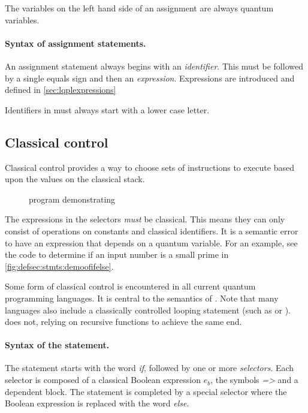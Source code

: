 The variables  on the left hand side of an
assignment are always quantum variables.
\paragraph{Syntax of assignment statements.} An assignment statement always
begins with an \emph{identifier}. This
must be followed by a single equals sign and then an \emph{expression}.
Expressions are introduced and defined  in \vref{sec:lqplexpressions}

Identifiers in \lqpl{} must always start with a lower case letter.


\subsection{Classical control}\label{subsec:classicalcontrolstatements}
Classical control provides a way to choose sets of instructions
to execute based upon the values on the classical stack. 

\begin{figure}[htbp]
\begin{singlespace}

\end{singlespace}
\caption{\lqpl{} program demonstrating }
\label{fig:defsec:stmts:demoofifelse}
\end{figure}

The expressions in the selectors 
\emph{must} be classical. This means they can only consist of
operations on  constants and classical identifiers. 
It is a semantic error to 
have an expression that depends on a
quantum variable. For an example, see the code to determine if
an input number is a small prime in \vref{fig:defsec:stmts:demoofifelse}.

Some form of classical control is encountered in all current quantum 
programming languages. It is central to the semantics of \cite{selinger04:qpl}.
Note that many languages also include a classically controlled 
looping statement (such as  or ). \lqpl{} 
does not, relying on recursive functions to achieve the same end.

\paragraph{Syntax of the   statement.} 
The statement starts
with the word \emph{if}, followed by one or more \emph{selectors}.
Each selector is composed of a classical Boolean expression $e_b$, the
symbols \emph{=>} and a dependent block. 
 The statement is 
completed by a special selector where the Boolean expression is
replaced with the word \emph{else}. 

